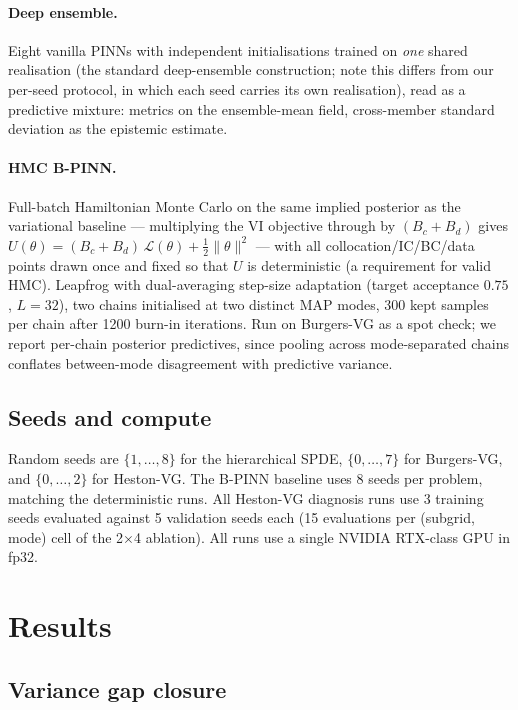 \documentclass[review,12pt]{elsarticle}
\begin{document}
\paragraph{Deep ensemble.} Eight vanilla PINNs with independent
initialisations trained on \emph{one} shared realisation (the standard
deep-ensemble construction; note this differs from our per-seed protocol,
in which each seed carries its own realisation), read as a predictive
mixture: metrics on the ensemble-mean field, cross-member standard
deviation as the epistemic estimate.

\paragraph{HMC B-PINN.} Full-batch Hamiltonian Monte Carlo on the same
implied posterior as the variational baseline --- multiplying the VI
objective through by \((B_c+B_d)\) gives
\(U(\theta) = (B_c{+}B_d)\,\mathcal{L}(\theta) + \tfrac12\|\theta\|^2\) ---
with all collocation/IC/BC/data points drawn once and fixed so that
\(U\) is deterministic (a requirement for valid HMC). Leapfrog with
dual-averaging step-size adaptation (target acceptance $0.75$, $L{=}32$),
two chains initialised at two distinct MAP modes, 300 kept samples per
chain after 1200 burn-in iterations. Run on Burgers-VG as a spot check;
we report per-chain posterior predictives, since pooling across
mode-separated chains conflates between-mode disagreement with
predictive variance.

\subsection{Seeds and compute}

Random seeds are \(\{1,\ldots,8\}\) for the hierarchical SPDE,
\(\{0,\ldots,7\}\) for Burgers-VG, and \(\{0,\ldots,2\}\) for
Heston-VG. The B-PINN baseline uses 8 seeds per problem, matching
the deterministic runs. All Heston-VG diagnosis runs use 3 training
seeds evaluated against 5 validation seeds each (15 evaluations per
(subgrid, mode) cell of the 2\(\times\)4 ablation). All runs use a
single NVIDIA RTX-class GPU in fp32.

\section{Results}
\label{sec:results}

\subsection{Variance gap closure}
\label{subsec:variance-gap}
\label{subsec:gap}
\end{document}

